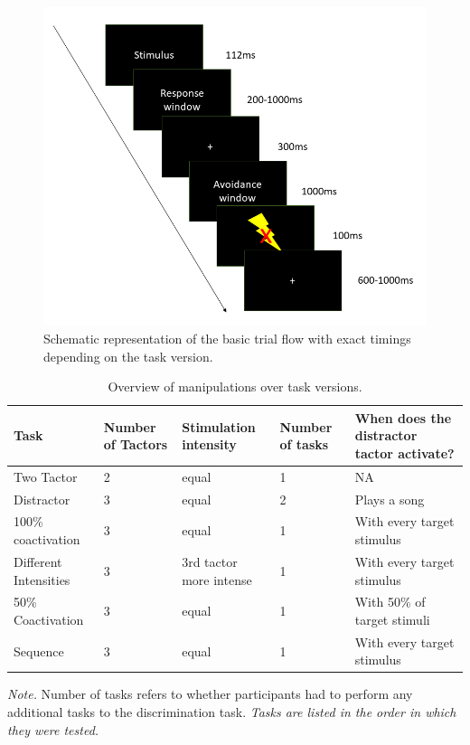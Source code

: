 \documentclass[twocolumn, serif, authordate, empirical]{jote-article}
\begin{document}
\begin{figure}
    \centering
    \includegraphics[width=\columnwidth]{articles/empirical/traxler/Figure 2_Trial and Error (-Related Negativity) (5).png}
    \caption{Schematic representation of the basic trial flow with exact timings depending on the task version.}
    \label{fig:2}
\end{figure}


\begin{table}\sffamily
\begin{tabular}{@{}p{}p{}p{}p{}p{}}
\toprule Task & Number of Tactors & Stimulation intensity & Number of tasks & When does the distractor tactor activate?\tabularnewline \midrule 
Two Tactor & 2 & equal & 1 & NA\tabularnewline Distractor & 3 & equal & 2 & Plays a song\tabularnewline 100\% coactivation & 3 & equal & 1 & With every target stimulus\tabularnewline Different Intensities & 3 & 3rd tactor more intense & 1 & With every target stimulus\tabularnewline 50\% Coactivation & 3 & equal & 1 & With 50\% of target stimuli\tabularnewline Sequence & 3 & equal & 1 & With every target stimulus\tabularnewline \bottomrule 
\end{tabular}
\caption{Overview of manipulations over task versions.}
\label{tab:1}
\end{table}

\emph{Note.} Number of tasks refers to whether participants had to perform any additional tasks to the discrimination task. \emph{Tasks are listed in the order in which they were tested.}
\end{document}
